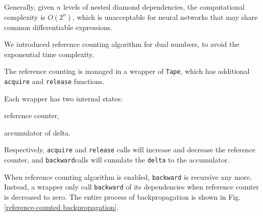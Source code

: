 Generally, given $n$ levels of nested diamond dependencies, the computational complexity is $O(2^n)$, which is unacceptable for neural networks that may share common \glspl{differentiable expression}.

We introduced reference counting algorithm for dual numbers, to avoid the exponential time complexity.

The reference counting is managed in a wrapper of \lstinline{Tape}, which has additional \lstinline{acquire} and \lstinline{release} functions.

Each wrapper has two internal states:
\begin{enumerate*}
  \item reference counter,
  \item accumulator of delta.
\end{enumerate*}
Respectively, \lstinline{acquire} and \lstinline{release} calls will increase and decrease the reference counter, and \lstinline{backward}calls will cumulate the \lstinline{delta} to the accumulator.

When reference counting algorithm is enabled, \lstinline{backward} is recursive any more. Instead, a wrapper only call \lstinline{backward} of its dependencies when reference counter is decreased to zero. The entire process of backpropagation is shown in Fig. \ref{reference-counted backpropagation}.

